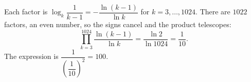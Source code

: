 Each factor is $\log_k\dfrac1{k-1}=-\dfrac{\ln(k-1)}{\ln k}$ for $k=3,\dots,1024$. There are $1022$ factors, an even number, so the signs cancel and the product telescopes:
\[\prod_{k=3}^{1024}\dfrac{\ln(k-1)}{\ln k}=\dfrac{\ln2}{\ln1024}=\dfrac1{10}.\]
The expression is $\dfrac{1}{\left(\dfrac1{10}\right)^2}=\boxed{100}$.
